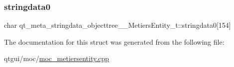 \subsubsection{\texorpdfstring{stringdata0}{stringdata0}}
{\footnotesize\ttfamily char qt\+\_\+meta\+\_\+stringdata\+\_\+objecttree\+\_\+\+\_\+\+Metiers\+Entity\+\_\+t\+::stringdata0\mbox{[}154\mbox{]}}



The documentation for this struct was generated from the following file\+:\begin{DoxyCompactItemize}
\item 
qtgui/moc/\mbox{\hyperlink{moc__metiersentity_8cpp}{moc\+\_\+metiersentity.\+cpp}}\end{DoxyCompactItemize}
